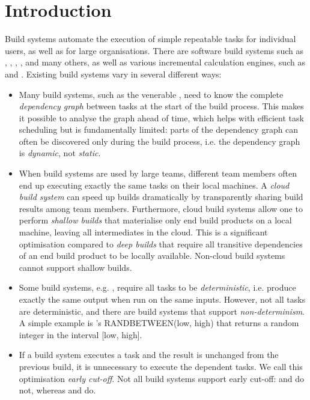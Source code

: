 \section{Introduction}\label{sec-intro}

Build systems automate the execution of simple repeatable tasks for individual
users, as well as for large organisations. There are software build systems such
as \Make, \Ninja, \Shake, \Bazel, \Buck and many others, as well as various
incremental calculation engines, such as \Excel and \Calc. Existing build
systems vary in several different ways:

\begin{itemize}
    \item Many build systems, such as the venerable \Make, need to know the
    complete \emph{dependency graph} between tasks at the start of the build
    process. This makes it possible to analyse the graph ahead of time, which
    helps with efficient task scheduling but is fundamentally limited: parts of
    the dependency graph can often be discovered only during the build process,
    i.e. the dependency graph is \emph{dynamic}, not \emph{static}.

    \item When build systems are used by large teams, different team members
    often end up executing exactly the same tasks on their local machines.
    A \emph{cloud build system} can speed up builds dramatically by
    transparently sharing build results among team members. Furthermore, cloud
    build systems allow one to perform \emph{shallow builds} that materialise
    only end build products on a local machine, leaving all intermediates in the
    cloud. This is a significant optimisation compared to \emph{deep builds}
    that require all transitive dependencies of an end build product to be
    locally available. Non-cloud build systems cannot support shallow builds.

    \item Some build systems, e.g. \Buck, require all tasks to be
    \emph{deterministic}, i.e. produce exactly the same output when run on the
    same inputs. However, not all tasks are deterministic, and there are build
    systems that support \emph{non-determinism}. A simple example is \Excel's
    \textsf{RANDBETWEEN(low, high)} that returns a random integer in the
    interval \textsf{[low, high]}.

    \item If a build system executes a task and the result is unchanged from the
    previous build, it is unnecessary to execute the dependent tasks. We call
    this optimisation \emph{early cut-off}. Not all build systems support early
    cut-off: \Make and \Excel do not, whereas \Shake and \Buck do.


\end{itemize}
